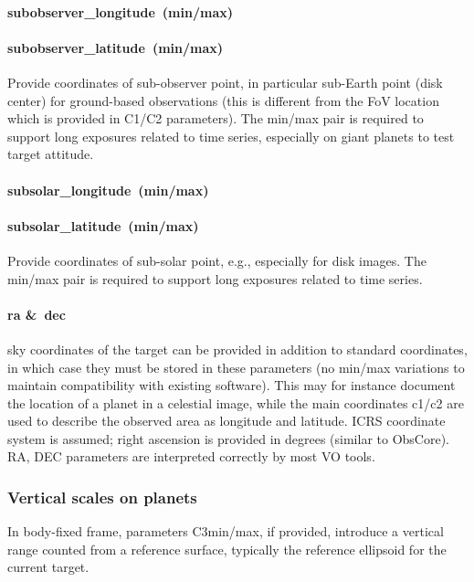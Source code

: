 \documentclass[11pt,a4paper]{ivoa}
\begin{document}
\paragraph{subobserver\_longitude (min/max)}

\paragraph{subobserver\_latitude (min/max)}

Provide coordinates of sub-observer point, in particular sub-Earth point (disk center) for ground-based observations (this is different from the FoV location which is provided in C1/C2 parameters). The min/max pair is required to support long exposures related to time series, especially on giant planets to test target attitude.

\paragraph{subsolar\_longitude (min/max)}

\paragraph{subsolar\_latitude (min/max)}

Provide coordinates of sub-solar point, e.g., especially for disk images. The min/max pair is required to support long exposures related to time series.

\paragraph{ra \& dec}

sky coordinates of the target can be provided in addition to standard coordinates, in which case they must be stored in these parameters (no min/max variations to maintain compatibility with existing software). This may for instance document the location of a planet in a celestial image, while the main coordinates c1/c2 are used to describe the observed area as longitude and latitude. ICRS coordinate system is assumed; right ascension is provided in degrees (similar to ObsCore). RA, DEC parameters are interpreted correctly by most VO tools.

\subsubsection{Vertical scales on planets}

In body-fixed frame, parameters C3min/max, if provided, introduce a vertical range counted from a reference surface, typically the reference ellipsoid for the current target. \\
\end{document}
